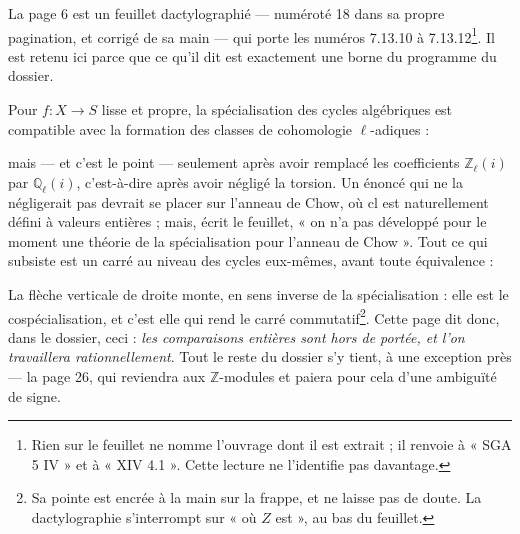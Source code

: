 \documentclass[11pt,a4paper]{article}
\begin{document}
La page 6 est un feuillet dactylographié — numéroté 18 dans sa propre
pagination, et corrigé de sa main — qui porte les numéros 7.13.10 à
7.13.12\footnote{Rien sur le feuillet ne nomme l'ouvrage dont il est extrait ;
il renvoie à « SGA 5 IV » et à « XIV 4.1 ». Cette lecture ne l'identifie pas
davantage.}. Il est retenu ici parce que ce qu'il dit est exactement une borne
du programme du dossier.

Pour $f \colon X \to S$ lisse et propre, la spécialisation des cycles
algébriques est compatible avec la formation des classes de cohomologie
$\ell$-adiques :


mais — et c'est le point — seulement après avoir remplacé les coefficients
$\mathbb{Z}_{\ell}(i)$ par $\mathbb{Q}_{\ell}(i)$, c'est-à-dire après avoir
négligé la torsion. Un énoncé qui ne la négligerait pas devrait se placer sur
l'anneau de Chow, où $\mathrm{cl}$ est naturellement défini à valeurs entières ;
mais, écrit le feuillet, « on n'a pas développé pour le moment une théorie de la
spécialisation pour l'anneau de Chow ». Tout ce qui subsiste est un carré au
niveau des cycles eux-mêmes, avant toute équivalence :


La flèche verticale de droite monte, en sens inverse de la spécialisation : elle
est le cospécialisation, et c'est elle qui rend le carré commutatif\footnote{Sa
pointe est encrée à la main sur la frappe, et ne laisse pas de doute. La
dactylographie s'interrompt sur « où $Z$ est », au bas du feuillet.}. Cette
page dit donc, dans le dossier, ceci : \emph{les comparaisons entières sont
hors de portée, et l'on travaillera rationnellement}. Tout le reste du dossier
s'y tient, à une exception près — la page 26, qui reviendra aux
$\mathbb{Z}$-modules et paiera pour cela d'une ambiguïté de signe.
\end{document}

